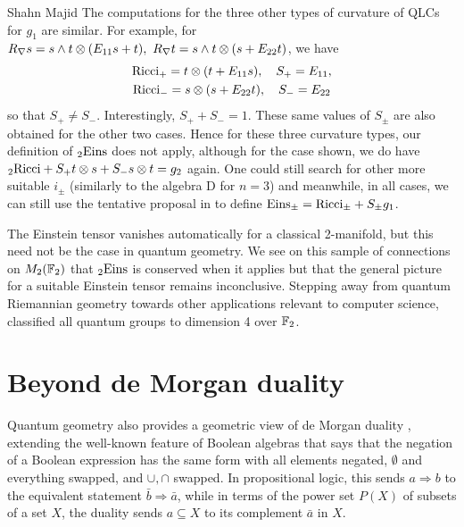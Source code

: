 \begin{artengenv}{Shahn Majid}
The computations for the three other types of curvature of QLCs for $g_1$ are similar. For example, for $R_\nabla s=s\wedge t\otimes (E_{11}s+t),\ R_\nabla t=s\wedge t\otimes (s+E_{22}t)$, we have
\[\begin{gathered}
{\rm Ricci}_+=t\otimes (t+ E_{11}s),\quad S_+=E_{11},\\ {\rm Ricci}_-=s\otimes (s+E_{22}t),\quad S_-=E_{22}
\end{gathered}
 \]
so that $S_+\ne S_-$. Interestingly, $S_++S_-=1$.  These same values of $S_\pm$ are also obtained for the other two cases. Hence for these three curvature types, our definition of ${}_2{\rm Eins}$ does not apply, although for the case shown, we do have ${}_2{\rm Ricci}+S_+t\otimes s+S_-s\otimes t=g_2$ again. One could still search for other more suitable $i_\pm$ (similarly to the algebra D for $n=3$) and meanwhile, in all cases, we can still use the tentative proposal in \parencite{MaPac2} to define ${\rm Eins}_\pm={\rm Ricci}_\pm+ S_\pm g_1$. \endproof 


The Einstein tensor vanishes automatically for a classical 2-manifold, but this need not be the case in quantum geometry. We see on this sample of connections on $M_2({\mathbb{F}}_2)$ that ${}_2{\rm Eins}$ is conserved when it applies but that the general picture for a suitable Einstein tensor remains inconclusive. Stepping away from quantum Riemannian geometry towards other applications relevant to computer science,  \parencite{MaPac3} classified all quantum groups to dimension 4 over ${\mathbb{F}}_2$. 

\section{Beyond de Morgan duality}\label{secMor}

Quantum geometry also provides a geometric view of de Morgan duality \parencite{Ma:boo}, extending the well-known feature of Boolean algebras that says that the negation of a Boolean expression has the same form with all elements negated, $\emptyset$ and everything swapped, and $\cup,\cap$ swapped. In propositional logic, this sends $a\Rightarrow b$ to the equivalent statement $\bar b\Rightarrow \bar a$, while in terms of the power set $P(X)$ of subsets of a set $X$, the duality sends $a\subseteq X$ to its complement $\bar a$ in $X$. 


\end{artengenv}
